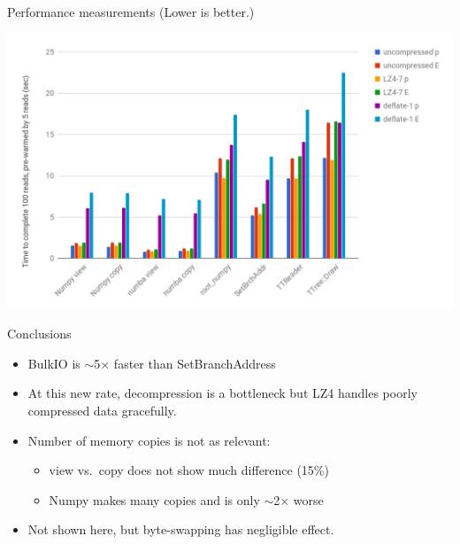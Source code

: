 \documentclass{beamer}
\begin{document}
\begin{frame}{Performance measurements}
\vspace{0.5 cm}
(Lower is better.)

\vspace{0.1 cm}
\includegraphics[width=1.1\linewidth]{chart.png}
\end{frame}

\begin{frame}{Conclusions}
\vspace{0.5 cm}
\large
\begin{itemize}\setlength{\itemsep}{0.5 cm}
\item BulkIO is $\sim$5$\times$ faster than SetBranchAddress
\item At this new rate, decompression is a bottleneck but LZ4 handles poorly compressed data gracefully.
\item Number of memory copies is not as relevant:

\vspace{0.1 cm}
\begin{itemize}\setlength{\itemsep}{0.05 cm}
\item view vs.\ copy does not show much difference (15\%)
\item Numpy makes many copies and is only $\sim$2$\times$ worse
\end{itemize}

\item Not shown here, but byte-swapping has negligible effect.

\end{itemize}
\end{frame}
\end{document}
